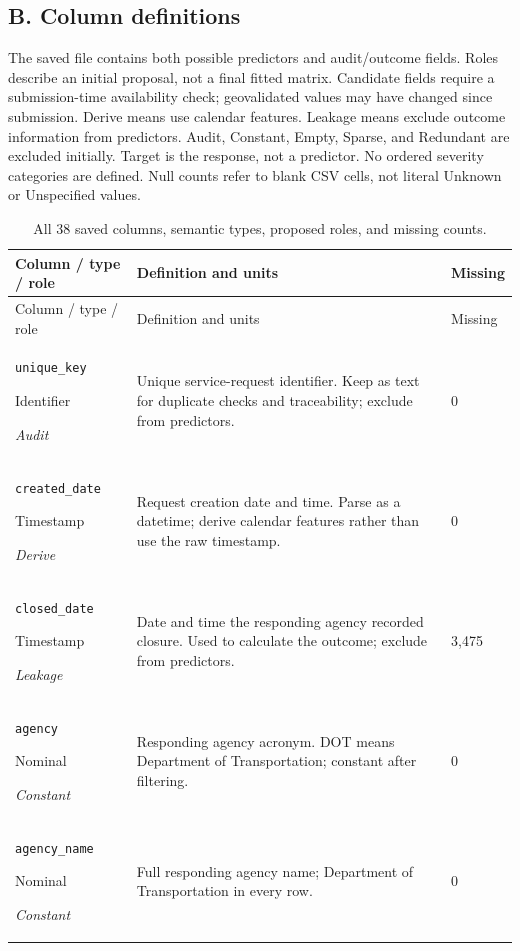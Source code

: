 \subsection*{B. Column definitions}
The saved file contains both possible predictors and audit/outcome fields. Roles describe an initial proposal, not a final fitted matrix. Candidate fields require a submission-time availability check; geovalidated values may have changed since submission. Derive means use calendar features. Leakage means exclude outcome information from predictors. Audit, Constant, Empty, Sparse, and Redundant are excluded initially. Target is the response, not a predictor. No ordered severity categories are defined. Null counts refer to blank CSV cells, not literal Unknown or Unspecified values.
\begin{longtable}{@{}p{.27\linewidth}p{.60\linewidth}p{.07\linewidth}@{}}
\caption{All 38 saved columns, semantic types, proposed roles, and missing counts.}\\
\toprule Column / type / role & Definition and units & Missing\\\midrule\endfirsthead
\toprule Column / type / role & Definition and units & Missing\\\midrule\endhead
\bottomrule\endfoot
\texttt{unique\_\allowbreak{}key}\par Identifier\par\emph{Audit} & Unique service-request identifier. Keep as text for duplicate checks and traceability; exclude from predictors. & 0\\
\texttt{created\_\allowbreak{}date}\par Timestamp\par\emph{Derive} & Request creation date and time. Parse as a datetime; derive calendar features rather than use the raw timestamp. & 0\\
\texttt{closed\_\allowbreak{}date}\par Timestamp\par\emph{Leakage} & Date and time the responding agency recorded closure. Used to calculate the outcome; exclude from predictors. & 3,475\\
\texttt{agency}\par Nominal\par\emph{Constant} & Responding agency acronym. DOT means Department of Transportation; constant after filtering. & 0\\
\texttt{agency\_\allowbreak{}name}\par Nominal\par\emph{Constant} & Full responding agency name; Department of Transportation in every row. & 0\\

\end{longtable}
